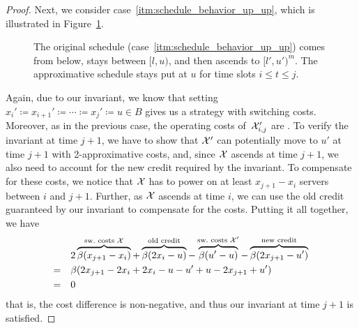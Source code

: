 \begin{proof}
Next, we consider case~\ref{itm:schedule_behavior_up_up}, which is illustrated in Figure~\ref{fig:schedule_behavior_up_up}.
\begin{figure}[ht]
\centering
	
\caption{The original schedule (case~\ref{itm:schedule_behavior_up_up}) comes from below, stays between $[l,u)$, and then ascends to $[l',u')^m$. The approximative schedule stays put at $u$ for time slots $i\le t\le j$.}
\label{fig:schedule_behavior_up_up}
\end{figure}
Again, due to our invariant, we know that setting $x_i'\coloneqq x_{i+1}'\coloneqq\dotsb\coloneqq x_j'\coloneqq u\in B$ gives us a strategy with  switching costs. Moreover, as in the previous case, the operating costs of~$\mathcal{X}_{i,j}'$ are . To verify the invariant at time $j+1$, we have to show that $\mathcal{X}'$ can potentially move to $u'$ at time $j+1$ with 2-approximative costs, and, since $\mathcal{X}$ ascends at time $j+1$, we also need to account for the new credit required by the invariant. To compensate for these costs, we notice that $\mathcal{X}$ has to power on at least $x_{j+1}-x_i$ servers between $i$ and $j+1$. Further, as $\mathcal{X}$ ascends at time $i$, we can use the old credit guaranteed by our invariant to compensate for the costs. Putting it all together, we have
\begin{align*}
	&2\overbrace{\beta(x_{j+1}-x_i)}^{\text{sw.\ costs }\mathcal{X}}+\overbrace{\beta(2x_i-u)}^{\text{old credit}}-\overbrace{\beta(u'-u)}^{\text{sw.\ costs }\mathcal{X}'}-\overbrace{\beta(2x_{j+1}-u')}^{\text{new credit}}\\
	=\quad&\beta(2x_{j+1}-2x_i+2x_i-u-u'+u-2x_{j+1}+u')\\
	=\quad&0
\end{align*}
that is, the cost difference is non-negative, and thus our invariant at time $j+1$ is satisfied.
	

\end{proof}

